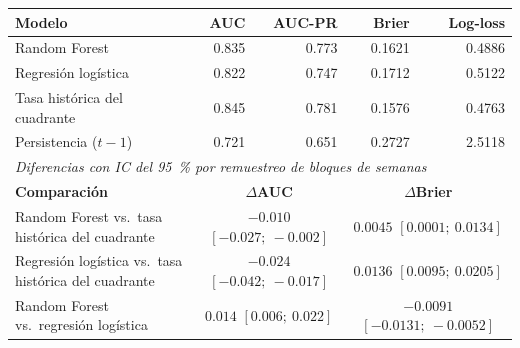 \begin{tabular}{l r r r r}
\toprule
\textbf{Modelo} & \textbf{AUC} & \textbf{AUC-PR} & \textbf{Brier} & \textbf{Log-loss} \\
\midrule
Random Forest & 0.835 & 0.773 & 0.1621 & 0.4886 \\
Regresión logística & 0.822 & 0.747 & 0.1712 & 0.5122 \\
Tasa histórica del cuadrante & 0.845 & 0.781 & 0.1576 & 0.4763 \\
Persistencia ($t-1$) & 0.721 & 0.651 & 0.2727 & 2.5118 \\
\midrule
\multicolumn{5}{l}{\textit{Diferencias con IC del 95~\% por remuestreo de bloques de semanas}} \\
\textbf{Comparación} & \multicolumn{2}{c}{\textbf{$\Delta$AUC}} & \multicolumn{2}{c}{\textbf{$\Delta$Brier}} \\
\midrule
Random Forest vs.\ tasa histórica del cuadrante & \multicolumn{2}{c}{$-0{.}010$ $[-0{.}027;\ -0{.}002]$} & \multicolumn{2}{c}{$0{.}0045$ $[0{.}0001;\ 0{.}0134]$} \\
Regresión logística vs.\ tasa histórica del cuadrante & \multicolumn{2}{c}{$-0{.}024$ $[-0{.}042;\ -0{.}017]$} & \multicolumn{2}{c}{$0{.}0136$ $[0{.}0095;\ 0{.}0205]$} \\
Random Forest vs.\ regresión logística & \multicolumn{2}{c}{$0{.}014$ $[0{.}006;\ 0{.}022]$} & \multicolumn{2}{c}{$-0{.}0091$ $[-0{.}0131;\ -0{.}0052]$} \\
\bottomrule
\end{tabular}
